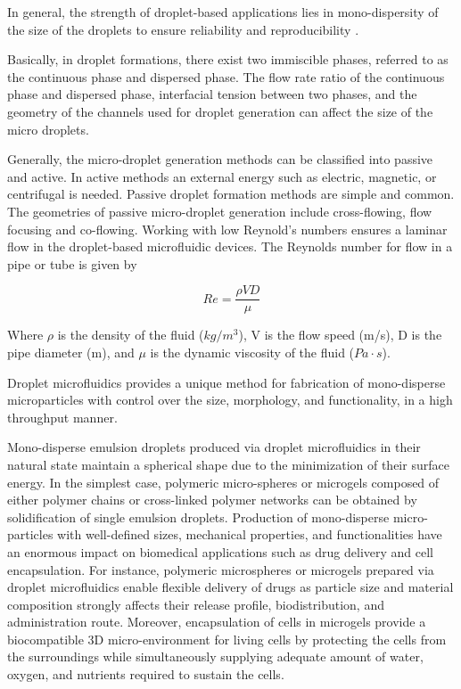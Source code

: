 In general, the strength of droplet-based applications lies in mono-dispersity of the size of the droplets to ensure reliability and reproducibility \parencite{Zhu2017}. 

Basically, in droplet formations, there exist two immiscible phases, referred to as the continuous phase and dispersed phase. The flow rate ratio of the continuous phase and dispersed phase, interfacial tension between two phases, and the geometry of the channels used for droplet generation can affect the size of the micro droplets. \parencite{Gu2011,Sharma2012}

Generally, the micro-droplet generation methods can be classified into passive and active. In active methods an external energy such as electric, magnetic, or centrifugal is needed. Passive droplet formation methods are simple and common. The geometries of passive micro-droplet generation include cross-flowing, flow focusing and co-flowing.  Working with low Reynold's numbers ensures a laminar flow in the droplet-based microfluidic devices. \parencite{Zhu2017,Zhu2019} The Reynolds number for flow in a pipe or tube is given by 

\begin{equation*}
Re = \frac{\rho V D}{\mu}    
\end{equation*}

\noindent Where $\rho$ is the density of the fluid ($kg/m^3$), V is the flow speed (m/s), D is the pipe diameter (m), and $\mu$ is the dynamic viscosity of the fluid ($Pa \cdot s$). \parencite{rothmayerfundamentals} 

\noindent Droplet microfluidics provides a unique method for fabrication of mono-disperse microparticles with control over the size, morphology, and functionality, in a high throughput manner. \parencite{Zhu2017, Zhu2019}

Mono-disperse emulsion droplets produced via droplet microfluidics in their natural state maintain a spherical shape due to the minimization of their surface energy. In the simplest case, polymeric micro-spheres or microgels composed of either polymer chains or cross-linked polymer networks can be obtained by solidification of single emulsion droplets. \parencite{Choi2019,2020} Production of mono-disperse micro-particles with well-defined sizes, mechanical properties, and functionalities have an enormous impact on biomedical applications such as drug delivery and cell encapsulation. For instance, polymeric microspheres or microgels prepared via droplet microfluidics enable flexible delivery of drugs as particle size and material composition strongly affects their release profile, biodistribution, and administration route. Moreover, encapsulation of cells in microgels provide a biocompatible 3D micro-environment for living cells by protecting the cells from the surroundings while simultaneously supplying adequate amount of water, oxygen, and nutrients required to sustain the cells. \parencite{Zhu2017,Kim2013,Zhu2019,Utech2015} 


